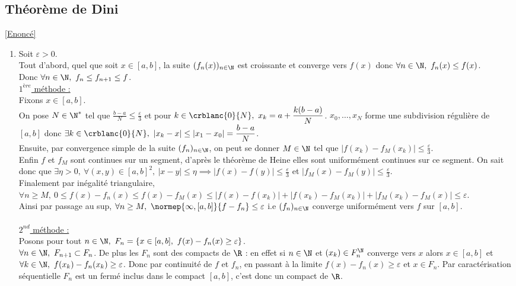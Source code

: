 \documentclass{book}
\begin{document}
	\subsection{Théorème de Dini }
	\label{Théorème de Dini corrigé}
	\textcolor{blue}{\hyperref[Théorème de Dini]{[Enoncé]}}\\
	\begin{enumerate}[leftmargin=*]
		\item Soit $\varepsilon>0$.\\
		Tout d'abord, quel que soit $x\in [a,b]$, la suite $(f_n(x))_{n\in \N}$ est croissante et converge vers $f(x)$ donc $\forall n\in \N,\ f_n(x)\leq f(x)$.\\
		Donc $\forall n\in \N,\ f_n\leq f_{n+1}\leq f$.\\
		\underline{$1^{ère}$ méthode :}\\
		Fixons $x\in [a,b]$.\\
		On pose $N\in \N^*$ tel que $\displaystyle\frac{b-a}{N}\leq \frac{\varepsilon}{3}$ et pour $k\in \crblanc{0}{N},\ x_k=\displaystyle a+\frac{k(b-a)}{N}$. $x_0,\dots,x_N$ forme une subdivision régulière de $[a,b]$ donc $\exists k\in \crblanc{0}{N},\ |x_k-x|\leq |x_1-x_0|=\displaystyle\frac{b-a}{N}$.\\
		Ensuite, par convergence simple de la suite $(f_n)_{n\in \N}$, on peut se donner $M\in \N$ tel que $|f(x_k)-f_M(x_k)|\leq \displaystyle\frac{\varepsilon}{3}$.\\
		Enfin $f$ et $f_M$ sont continues sur un segment, d'après le théorème de Heine elles sont uniformément continues sur ce segment. On sait donc que $\exists \eta>0,\ \forall (x,y)\in [a,b]^2,\ |x-y|\leq \eta\implies |f(x)-f(y)|\leq \displaystyle\frac{\varepsilon}{3}$ et $|f_M(x)-f_M(y)|\leq \displaystyle\frac{\varepsilon}{3}$.\\
		Finalement par inégalité triangulaire,\\
		$\forall n\geq M,\ 0\leq f(x)-f_n(x)\leq f(x)-f_M(x)\leq |f(x)-f(x_k)|+|f(x_k)-f_M(x_k)|+|f_M(x_k)-f_M(x)|\leq \varepsilon$.\\
		Ainsi par passage au sup, $\forall n\geq M,\ \normep{\infty,[a,b]}{f-f_n}\leq \varepsilon$ i.e $(f_n)_{n\in \N}$ converge uniformément vers $f$ sur $[a,b]$.\\\\
		\underline{$2^{nd}$ méthode :}\\
		Posons pour tout $n\in \N,\ F_n=\{x\in [a,b],\ f(x)-f_n(x)\geq \varepsilon\}$.\\
		$\forall n\in \N,\ F_{n+1}\subset F_n$. De plus les $F_n$ sont des compacts de $\R$ : en effet si $n\in \N$ et $(x_k)\in F_n^\N$ converge vers $x$ alors $x\in [a,b]$ et $\forall k\in \N,\ f(x_k)-f_n(x_k)\geq \varepsilon$. Donc par continuité de $f$ et $f_n$, en passant à la limite $f(x)-f_n(x)\geq \varepsilon$ et $x\in F_n$. Par caractérisation séquentielle $F_n$ est un fermé inclus dans le compact $[a,b]$, c'est donc un compact de $\R$.\\

\end{enumerate}
\end{document}
